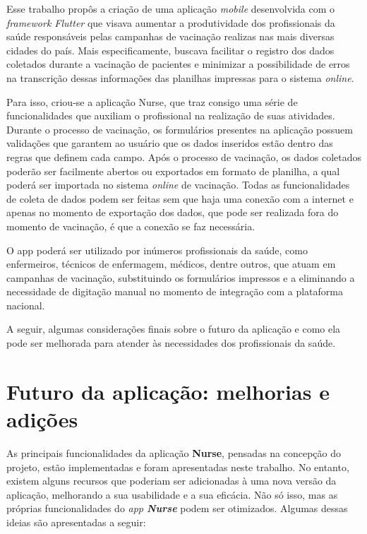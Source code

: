 
\label{Cap:Conclusao}
Esse trabalho propôs a criação de uma aplicação \textit{mobile} desenvolvida com o \textit{framework Flutter} que visava aumentar a produtividade dos profissionais da saúde responsáveis pelas campanhas de vacinação realizas nas mais diversas cidades do país. Mais especificamente, buscava facilitar o registro dos dados coletados durante a vacinação de pacientes e minimizar a possibilidade de erros na transcrição dessas informações das planilhas impressas para o sistema \textit{online}.

Para isso, criou-se a aplicação Nurse, que traz consigo uma série de funcionalidades que auxiliam o profissional na realização de suas atividades. Durante o processo de vacinação, os formulários presentes na aplicação possuem validações que garantem ao usuário que os dados inseridos estão dentro das regras que definem cada campo. Após o processo de vacinação, os dados coletados poderão ser facilmente abertos ou exportados em formato de planilha, a qual poderá ser importada no sistema \textit{online} de vacinação. Todas as funcionalidades de coleta de dados podem ser feitas sem que haja uma conexão com a internet e apenas no momento de exportação dos dados, que pode ser realizada fora do momento de vacinação, é que a conexão se faz necessária.

O app poderá ser utilizado por inúmeros profissionais da saúde, como enfermeiros, técnicos de enfermagem, médicos, dentre outros, que atuam em campanhas de vacinação, substituindo os formulários impressos e a eliminando a necessidade de digitação manual no momento de integração com a plataforma nacional.

A seguir, algumas considerações finais sobre o futuro da aplicação e como ela pode ser melhorada para atender às necessidades dos profissionais da saúde.

\section{Futuro da aplicação: melhorias e adições}
\label{cap6:Sec:FuturoNurse}
As principais funcionalidades da aplicação \textbf{Nurse}, pensadas na concepção do projeto, estão implementadas e foram apresentadas neste trabalho. No entanto, existem alguns recursos que poderiam ser adicionadas à uma nova versão da aplicação, melhorando a sua usabilidade e a sua eficácia. Não só isso, mas as próprias funcionalidades do \textit{app \textbf{Nurse}} podem ser otimizados. Algumas dessas ideias são apresentadas a seguir:

